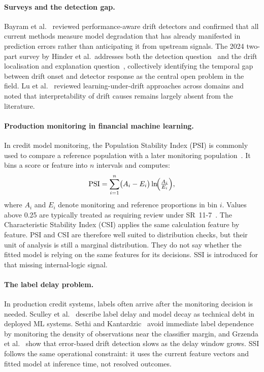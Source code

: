 \documentclass[pdflatex,sn-mathphys-num]{sn-jnl}
\theoremstyle{thmstyleone}
\theoremstyle{thmstyletwo}
\theoremstyle{thmstylethree}
\begin{document}
\paragraph{Surveys and the detection gap.}
Bayram et al.~\cite{bayram2022drift} reviewed performance-aware drift detectors
and confirmed that all current methods measure model degradation that has already
manifested in prediction errors rather than anticipating it from upstream
signals. The 2024 two-part survey by Hinder et al.\ addresses both the detection
question~\cite{hinder2024drift} and the drift localisation and explanation
question~\cite{hinder2024partb}, collectively identifying the temporal gap
between drift onset and detector response as the central open problem in the
field. Lu et al.~\cite{lu2018drift} reviewed learning-under-drift approaches
across domains and noted that interpretability of drift causes remains largely
absent from the literature.

\paragraph{Production monitoring in financial machine learning.}
In credit model monitoring, the Population Stability Index (PSI) is commonly
used to compare a reference population with a later monitoring
population~\cite{siddiqi2006scorecard}. It bins a score or feature into $n$
intervals and computes:
\begin{equation}
  \mathrm{PSI} = \sum_{i=1}^{n}
    \bigl(A_i - E_i\bigr)\ln\!\Bigl(\tfrac{A_i}{E_i}\Bigr),
  \label{eq:psi}
\end{equation}
where $A_i$ and $E_i$ denote monitoring and reference proportions in bin $i$.
Values above 0.25 are typically treated as requiring review under
SR~11-7~\cite{sr117_2011}. The Characteristic Stability Index (CSI) applies the
same calculation feature by feature. PSI and CSI are therefore well suited to
distribution checks, but their unit of analysis is still a marginal
distribution. They do not say whether the fitted model is relying on the same
features for its decisions. SSI is introduced for that missing internal-logic
signal.

\paragraph{The label delay problem.}
In production credit systems, labels often arrive after the monitoring decision
is needed. Sculley et al.~\cite{sculley2015debt} describe label delay and model
decay as technical debt in deployed ML systems. Sethi and
Kantardzic~\cite{sethi2015margin} avoid immediate label dependence by monitoring
the density of observations near the classifier margin, and Grzenda et
al.~\cite{grzenda2020delayed} show that error-based drift detection slows as the
delay window grows. SSI follows the same operational constraint: it uses the
current feature vectors and fitted model at inference time, not resolved
outcomes.
\end{document}

